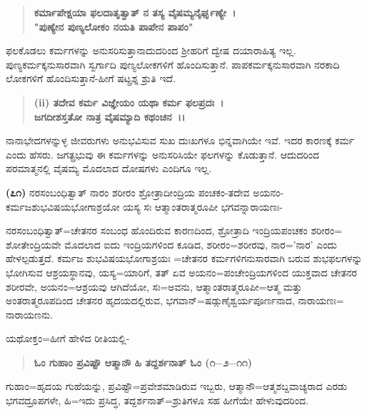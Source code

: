 \begin{verse}
\textbf{ಕರ್ಮಾಪೇಕ್ಷಯಾ ಫಲದಾತೃತ್ವಾತ್ ನ ತಸ್ಯ ವೈಷಮ್ಯನೈರ್ಘೃಣ್ಯೇ~।}\\\textbf{"ಪುಣ್ಯೇನ ಪುಣ್ಯಲೋಕಂ ನಯತಿ ಪಾಪೇನ ಪಾಪಂ"}
\end{verse}

\vspace{-.2cm}


\vskip 3pt

ಫಲಕೊಡಲು ಕರ್ಮಗಳನ್ನು ಅನುಸರಿಸುತ್ತಾನಾದುದರಿಂದ ಶ‍್ರೀಹರಿಗೆ ದ್ವೇಷ ದಯಾ\-ರಾಹಿತ್ಯ ಇಲ್ಲ. ಪುಣ್ಯಕರ್ಮಕ್ಕನುಸಾರವಾಗಿ ಸ್ವರ್ಗಾದಿ ಪುಣ್ಯಲೋಕಗಳಿಗೆ ಹೊಂದಿಸುತ್ತಾನೆ. ಪಾಪಕರ್ಮಕ್ಕನುಸಾರವಾಗಿ ನರಕಾದಿ ಲೋಕಗಳಿಗೆ ಹೊಂದಿಸುತ್ತಾನೆ-ಹೀಗೆ ಷಟ್ಪ್ರಶ್ನ ಶ್ರುತಿ ಇದೆ.

\vspace{-.1cm}

\begin{verse}
\textbf{(ii) ತದೇವ ಕರ್ಮ ವಿಜ್ಞೇಯಂ ಯಥಾ ಕರ್ಮ ಫಲಪ್ರದಃ~।}\\\textbf{ಜಗದೀಶಸ್ತತೋ ನಾತ್ರ ವೈಷಮ್ಯಾದಿ ಕಥಂಚನ~।।}
\end{verse}

\vspace{-.1cm}


ನಾನಾಭೇದಗಳನ್ನುಳ್ಳ ಜೀವರುಗಳು ಅನುಭವಿಸುವ ಸುಖ ದುಃಖಗಳೂ ಭಿನ್ನವಾಗಿಯೇ ಇವೆ. ಇದರ ಕಾರಣಕ್ಕೆ ಕರ್ಮ ಎಂದು ಹೆಸರು. ಜಗತ್ಪ್ರಭುವು ಈ ಕರ್ಮಗಳನ್ನು ಅನುಸರಿಸಿಯೇ ಫಲಗಳನ್ನು ಕೊಡುತ್ತಾನೆ. ಆದುದರಿಂದ ಪರಮಾತ್ಮನಲ್ಲಿ ವೈಷಮ್ಯ ಮೊದಲಾದ ದೋಷಗಳು ಎಂದಿಗೂ ಇಲ್ಲ.

\textbf{(೭೧)} ನರಸಂಬಂಧಿತ್ವಾತ್ ನಾರಂ ಶರೀರಂ ಶ್ರೋತ್ರಾದೀಂದ್ರಿಯ ಪಂಚಕಂ-ತದೇವ ಅಯನಂ-ಕರ್ಮಜಶುಭವಿಷಯಭೋಗಾಶ್ರಯೋ ಯಸ್ಯ ಸಃ ಆತ್ಮಾಂತರಾತ್ಮರೂಪೀ ಭಗ\break ವನ್ನಾರಾಯಣಃ-

ನರಸಂಬಂಧಿತ್ವಾತ್=ಚೇತನರ ಸಂಬಂಧ ಹೊಂದಿರುವ ಕಾರಣದಿಂದ, ಶ್ರೋತ್ರಾದಿ ಇಂದ್ರಿಯಪಂಚಕಂ ಶರೀರಂ= ಶೋತೇಂದ್ರಿಯವೇ ಮೊದಲಾದ ಐದು ಇಂದ್ರಿಯಗಳಿಂದ ಕೂಡಿದ, ಶರೀರಂ=ಶರೀರವು, ನಾರ='ನಾರ' ಎಂದು ಹೇಳಲ್ಪಡುತ್ತದೆ. ಕರ್ಮಜ ಶುಭವಿಷಯಭೋಗಾಶ್ರಯಃ =ಚೇತನರ ಕರ್ಮಗಳಿಗನುಸಾರವಾಗಿ ಬರುವ ಶುಭಫಲಗಳನ್ನು ಭೋಗಿಸುವ ಆಶ್ರಯಸ್ಥಾನವು, ಯಸ್ಯ=ಯಾರಿಗೆ, ತತ್ ಏವ ಅಯನಂ=ಪಂಚೇಂದ್ರಿಯ\-ಗಳಿಂದ ಯುಕ್ತವಾದ ಚೇತನರ ಶರೀರವೇ, ಅಯನಂ=ಆಶ್ರಯವು ಆಗಿದೆಯೋ, ಸಃ=ಅವನು, ಆತ್ಮಾಂತರಾತ್ಮರೂಪೀ=ಆತ್ಮ ಮತ್ತು ಅಂತರಾತ್ಮರೂಪದಿಂದ ಚೇತನರ ಹೃದಯದಲ್ಲಿರುವ, ಭಗವಾನ್=ಷಡ್ಗುಣೈಶ್ವರ್ಯಪೂರ್ಣನಾದ, ನಾರಾಯಣಃ= ನಾರಾಯಣನು.

ಯಥೋಕ್ತಂ=ಹೀಗೆ ಹೇಳಿದ ರೀತಿಯಲ್ಲಿ-

\begin{verse}
\textbf{ಓಂ ಗುಹಾಂ ಪ್ರವಿಷ್ಟೌ ಆತ್ಮಾನೌ ಹಿ ತದ್ದರ್ಶನಾತ್ ಓಂ (೧$-$೨$-$೧೧)}
\end{verse}

ಗುಹಾಂ=ಹೃದಯ ಗುಹೆಯನ್ನು, ಪ್ರವಿಷ್ಟೌ=ಪ್ರವೇಶಮಾಡಿರುವ ಇಬ್ಬರು, ಆತ್ಮಾನೌ=\-ಆತ್ಮಶಬ್ದವಾಚ್ಯರಾದ ಎರಡು ಭಗವದ್ರೂಪಗಳೇ, ಹಿ=ಇದು ಪ್ರಸಿದ್ಧ, ತದ್ದರ್ಶನಾತ್=ಶ್ರುತಿ\-ಗಳೂ ಸಹ ಹೀಗೆಯೇ ಹೇಳುವುದರಿಂದ.

